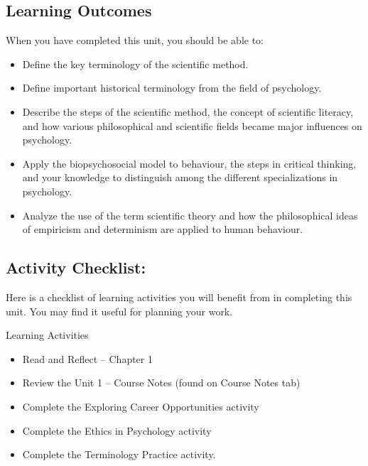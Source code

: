 \documentclass[
]{book}
\providecommand{\tightlist}{%
  \setlength{\itemsep}{0pt}\setlength{\parskip}{0pt}}
\begin{document}
\hypertarget{learning-outcomes}{%
\subsection*{Learning Outcomes}\label{learning-outcomes}}

When you have completed this unit, you should be able to:

\begin{itemize}
\tightlist
\item
  Define the key terminology of the scientific method.\\
\item
  Define important historical terminology from the field of psychology.\\
\item
  Describe the steps of the scientific method, the concept of scientific literacy, and how various philosophical and scientific fields became major influences on psychology.\\
\item
  Apply the biopsychosocial model to behaviour, the steps in critical thinking, and your knowledge to distinguish among the different specializations in psychology.\\
\item
  Analyze the use of the term scientific theory and how the philosophical ideas of empiricism and determinism are applied to human behaviour.
\end{itemize}

\hypertarget{activity-checklist}{%
\subsection*{Activity Checklist:}\label{activity-checklist}}

Here is a checklist of learning activities you will benefit from in completing this unit. You may find it useful for planning your work.

\begin{reflect}
{Learning Activities}

\begin{itemize}
\tightlist
\item
  Read and Reflect -- Chapter 1\\
\item
  Review the Unit 1 -- Course Notes (found on Course Notes tab)\\
\item
  Complete the Exploring Career Opportunities activity\\
\item
  Complete the Ethics in Psychology activity\\
\item
  Complete the Terminology Practice activity.
\end{itemize}
\end{reflect}
\end{document}
